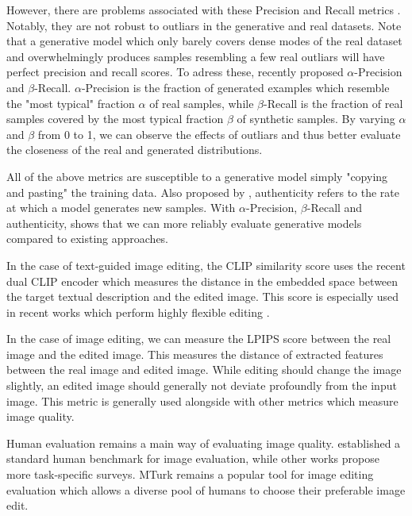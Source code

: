However, there are problems associated with these Precision and Recall metrics \citep{naeem2020reliable, alaa2022faithful}.
Notably, they are not robust to outliars in the generative and real datasets. Note that a generative model which only barely 
covers dense modes of the real dataset and overwhelmingly 
produces samples resembling a few real outliars will have perfect precision and recall scores. To adress these, 
\cite{alaa2022faithful} recently proposed $\alpha$-Precision and $\beta$-Recall. $\alpha$-Precision is the 
fraction of generated examples which resemble the "most typical" fraction $\alpha$ of real samples, while  $\beta$-Recall
is the fraction of real samples covered by the most typical fraction $\beta$ of synthetic samples. By varying 
$\alpha$ and $\beta$ from 0 to 1, we can observe the effects of outliars and thus better evaluate the closeness 
of the real and generated distributions. 

 All of the above metrics are susceptible to a generative model simply "copying and pasting" 
the training data. Also proposed by \cite{alaa2022faithful}, authenticity refers to the rate at which 
a model generates new samples. With  $\alpha$-Precision, $\beta$-Recall and authenticity, \cite{alaa2022faithful}
shows that we can more reliably evaluate generative models compared to existing approaches. 

 In the case of text-guided image editing, the CLIP similarity score uses the 
recent dual CLIP encoder \citep{radford2021learning} which measures the distance in the embedded space 
between the target textual description and the edited image. This score is especially used in recent 
works which perform highly flexible editing \citep{mokady2023null, hertz2022prompt}.

In the case of image editing, we can measure the LPIPS \citep{zhanglpips2018} score between 
the real image and the edited image. This measures the distance of extracted features between the 
real image and edited image. While editing should change the image slightly, an 
edited image should generally not deviate profoundly from the input image. This metric 
is generally used alongside with other metrics which measure image quality. 

Human evaluation remains a main way of evaluating image quality.  \cite{hype} 
established a standard human benchmark for image evaluation, while other works propose 
more task-specific surveys. \ac{MTurk} remains a popular tool for image editing 
evaluation which allows a diverse pool of humans to choose their preferable 
image edit. 


